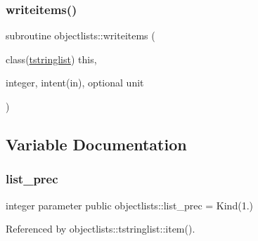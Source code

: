 \subsubsection{\texorpdfstring{writeitems()}{writeitems()}}
{\footnotesize\ttfamily subroutine objectlists\+::writeitems (\begin{DoxyParamCaption}\item[{class(\mbox{\hyperlink{structobjectlists_1_1tstringlist}{tstringlist}})}]{this,  }\item[{integer, intent(in), optional}]{unit }\end{DoxyParamCaption})\hspace{0.3cm}{\ttfamily [private]}}



\subsection{Variable Documentation}
\mbox{\label{namespaceobjectlists_a9d176bc6347eefeceba8cb520c6be81c}} 
\subsubsection{\texorpdfstring{list\+\_\+prec}{list\_prec}}
{\footnotesize\ttfamily integer parameter public objectlists\+::list\+\_\+prec = Kind(1.)}



Referenced by objectlists\+::tstringlist\+::item().

